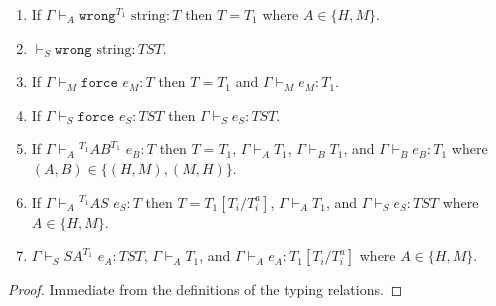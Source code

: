 \begin{lemma}
\begin{enumerate}
\item If $\Gamma\vdash_{A}\mathtt{wrong}^{T_{1}}$ $\mathrm{string}:T$ then $T=T_{1}$ where $A\in\lbrace H,M\rbrace$.

\item $\vdash_{S}\mathtt{wrong}$ $\mathrm{string}:TST$.

\item If $\Gamma\vdash_{M}\mathtt{force}$ $e_{M}:T$ then $T=T_{1}$ and $\Gamma\vdash_{M}e_{M}:T_{1}$.

\item If $\Gamma\vdash_{S}\mathtt{force}$ $e_{S}:TST$ then $\Gamma\vdash_{S}e_{S}:TST$.

\item If $\Gamma\vdash_{A}{^{T_{1}}A}B^{T_{1}}$ $e_{B}:T$ then $T=T_{1}$, $\Gamma\vdash_{A}T_{1}$, $\Gamma\vdash_{B}T_{1}$, and $\Gamma\vdash_{B}e_{B}:T_{1}$ where $(A,B)\in\lbrace(H,M),(M,H)\rbrace$.

\item If $\Gamma\vdash_{A}{^{T_{1}}A}S$ $e_{S}:T$ then $T=T_{1}[T_{i}/T_{i}^{a}]$, $\Gamma\vdash_{A}T_{1}$, and $\Gamma\vdash_{S}e_{S}:TST$ where $A\in\lbrace H,M\rbrace$.

\item $\Gamma\vdash_{S}SA^{T_{1}}$ $e_{A}:TST$, $\Gamma\vdash_{A}T_{1}$, and $\Gamma\vdash_{A}e_{A}:T_{1}[T_{i}/T_{i}^{a}]$ where $A\in\lbrace H,M\rbrace$.

\end{enumerate}

\begin{proof}

Immediate from the definitions of the typing relations.

\end{proof}

\end{lemma}